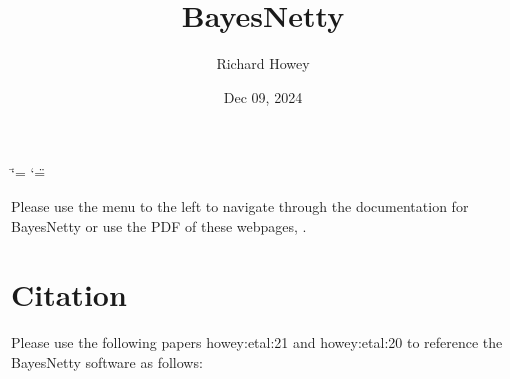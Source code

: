 \documentclass[letterpaper,10pt,english]{sphinxmanual}
\title{BayesNetty}
\date{Dec 09, 2024}
\author{Richard Howey}
\begin{document}
\ifdefined\shorthandoff
  \ifnum\catcode`\=\string=\active\shorthandoff{=}\fi
  \ifnum\catcode`\"=\active{}\fi
\fi

\pagestyle{empty}
\sphinxmaketitle
\pagestyle{plain}
\sphinxtableofcontents
\pagestyle{normal}
\label{\detokenize{index::doc}}


\sphinxAtStartPar
Please use the menu to the left to navigate through the documentation for BayesNetty or use the PDF of these webpages, .


\chapter{Citation}
\label{\detokenize{index:citation}}
\sphinxAtStartPar
Please use the following papers  howey:etal:21  and  howey:etal:20  to reference the BayesNetty software as follows:
\end{document}
